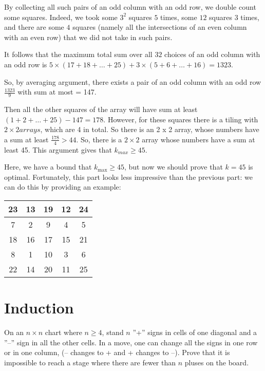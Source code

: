 By collecting all such pairs of an odd column with an odd row, we double count some squares. Indeed, we took some $3^2$ squares $5$ times, some $12$ squares $3$ times, and there are some $4$ squares (namely all the intersections of an even column with an even row) that we did not take in such pairs.

It follows that the maximum total sum over all $32$ choices of an odd column with an odd row is $5\times (17+18+\dots +25) + 3 \times (5+6+ \dots +16) = 1323$.

So, by averaging argument, there exists a pair of an odd column with an odd row $\frac{1323}{9}$ with sum at most = 147. 

Then all the other squares of the array will have sum at least $(1+2+ \dots +25)-147=178$. However, for these squares there is a tiling with $2 \times 2 arrays$, which are 4 in total. So there is an 2 x 2 array, whose numbers have a sum at least $\frac{178}{4} > 44$. So, there is a $2 \times 2$ array whose numbers have a sum at least 45. This argument gives that $k_{max} \geq 45$.

Here, we have a bound that $k_{\text{max}} \geq 45$, but now we should prove that $k=45$ is optimal. Fortunately, this part looks less impressive than the previous part: we can do this by providing an example:

\renewcommand{\arraystretch}{1.5}
\begin{center}
    \begin{tabular}{|c|c|c|c|c|}
        \hline
        23 & 13 & 19 & 12 & 24 \\\hline
        7  & 2  & 9  & 4  & 5  \\\hline
        18 & 16 & 17 & 15 & 21 \\\hline
        8  & 1  & 10 & 3  & 6  \\\hline
        22 & 14 & 20 & 11 & 25 \\\hline
    \end{tabular}
\end{center}
\renewcommand{\arraystretch}{1}

\section{Induction}

\begin{example}
    On an $n\times n$ chart where $n\geq 4$, stand $n$ ''+'' signs in cells of one diagonal and a ''--'' sign in all the other cells. In a move, one can change all the signs in one row or in one column, (-- changes to + and + changes to --). Prove that it is impossible to reach a stage where there are fewer than $n$ pluses on the board.
\end{example}

